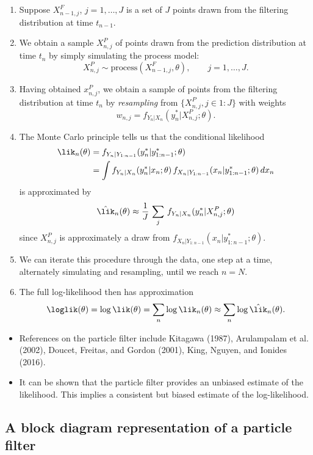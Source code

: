 \documentclass[
  letterpaper,
  DIV=11,
  numbers=noendperiod]{scrartcl}
\providecommand{\tightlist}{%
  \setlength{\itemsep}{0pt}\setlength{\parskip}{0pt}}\usepackage{longtable,booktabs,array}
\begin{document}
\begin{enumerate}
\def\labelenumi{\arabic{enumi}.}
\tightlist
\item
  Suppose \(X_{n-1,j}^{F}\), \(j=1,\dots,J\) is a set of \(J\) points
  drawn from the filtering distribution at time \(t_{n-1}\).
\item
  We obtain a sample \(X_{n,j}^{P}\) of points drawn from the prediction
  distribution at time \(t_n\) by simply simulating the process model:
  \[
  X_{n,j}^{P} \sim \mathrm{process}(X_{n-1,j}^{F},\theta), \qquad j=1,\dots,J.
  \]
\item
  Having obtained \(x_{n,j}^{P}\), we obtain a sample of points from the
  filtering distribution at time \(t_n\) by \emph{resampling} from
  \(\big\{X_{n,j}^{P},j\in 1:J\big\}\) with weights \[
  w_{n,j}=f_{Y_n|X_n}(y^*_{n}|X^P_{n,j};\theta).
  \]
\item
  The Monte Carlo principle tells us that the conditional likelihood \[
  \begin{aligned}
    \lik_n(\theta) &= f_{Y_n|Y_{1:n-1}}(y^*_n|y^*_{1:n-1};\theta)\\
    &= \int f_{Y_n|X_n}(y^*_{n}|x_{n};\theta)\,f_{X_n|Y_{1:n-1}}(x_{n}|y^*_{1:n-1};\theta)\, dx_n
  \end{aligned}
  \] is approximated by \[
    \hat{\lik}_n(\theta)\approx\frac{1}{J}\,\sum_j\,f_{Y_n|X_n}(y^*_{n}|X_{n,j}^{P};\theta)
  \] since \(X_{n,j}^{P}\) is approximately a draw from
  \(f_{X_n|Y_{1:n-1}}(x_{n}|y^*_{1:n-1};\theta)\).
\item
  We can iterate this procedure through the data, one step at a time,
  alternately simulating and resampling, until we reach \(n=N\).
\item
  The full log-likelihood then has approximation \[
  \loglik(\theta) = \log{{\lik}(\theta)} = \sum_n \log{{\lik}_n(\theta)} \approx \sum_n\log\hat{\lik}_n(\theta).
  \]
\end{enumerate}

\begin{itemize}
\tightlist
\item
  References on the particle filter include Kitagawa (1987), Arulampalam
  et al. (2002), Doucet, Freitas, and Gordon (2001), King, Nguyen, and
  Ionides (2016).
\item
  It can be shown that the particle filter provides an unbiased estimate
  of the likelihood. This implies a consistent but biased estimate of
  the log-likelihood.
\end{itemize}

\hypertarget{a-block-diagram-representation-of-a-particle-filter}{%
\subsection{A block diagram representation of a particle
filter}\label{a-block-diagram-representation-of-a-particle-filter}}
\end{document}
